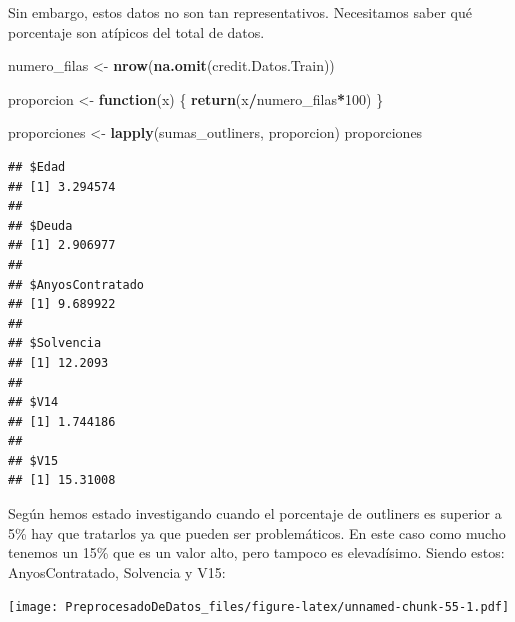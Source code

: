 \documentclass[
]{article}
\newenvironment{Shaded}{\begin{snugshade}}{\end{snugshade}}
\newcommand{\AttributeTok}[1]{\textcolor[rgb]{0.13,0.29,0.53}{#1}}
\newcommand{\ControlFlowTok}[1]{\textcolor[rgb]{0.13,0.29,0.53}{\textbf{#1}}}
\newcommand{\DecValTok}[1]{\textcolor[rgb]{0.00,0.00,0.81}{#1}}
\newcommand{\FloatTok}[1]{\textcolor[rgb]{0.00,0.00,0.81}{#1}}
\newcommand{\FunctionTok}[1]{\textcolor[rgb]{0.13,0.29,0.53}{\textbf{#1}}}
\newcommand{\NormalTok}[1]{#1}
\newcommand{\OtherTok}[1]{\textcolor[rgb]{0.56,0.35,0.01}{#1}}
\newcommand{\SpecialCharTok}[1]{\textcolor[rgb]{0.81,0.36,0.00}{\textbf{#1}}}
\newcommand{\StringTok}[1]{\textcolor[rgb]{0.31,0.60,0.02}{#1}}
\begin{document}
Sin embargo, estos datos no son tan representativos. Necesitamos saber
qué porcentaje son atípicos del total de datos.

\begin{Shaded}
\begin{Highlighting}[]
\NormalTok{numero\_filas }\OtherTok{\textless{}{-}} \FunctionTok{nrow}\NormalTok{(}\FunctionTok{na.omit}\NormalTok{(credit.Datos.Train))}

\NormalTok{proporcion }\OtherTok{\textless{}{-}} \ControlFlowTok{function}\NormalTok{(x) \{}
  \FunctionTok{return}\NormalTok{(x}\SpecialCharTok{/}\NormalTok{numero\_filas}\SpecialCharTok{*}\DecValTok{100}\NormalTok{)}
\NormalTok{\}}

\NormalTok{proporciones }\OtherTok{\textless{}{-}} \FunctionTok{lapply}\NormalTok{(sumas\_outliners, proporcion)}
\NormalTok{proporciones}
\end{Highlighting}
\end{Shaded}

\begin{verbatim}
## $Edad
## [1] 3.294574
## 
## $Deuda
## [1] 2.906977
## 
## $AnyosContratado
## [1] 9.689922
## 
## $Solvencia
## [1] 12.2093
## 
## $V14
## [1] 1.744186
## 
## $V15
## [1] 15.31008
\end{verbatim}

Según hemos estado investigando cuando el porcentaje de outliners es
superior a 5\% hay que tratarlos ya que pueden ser problemáticos. En
este caso como mucho tenemos un 15\% que es un valor alto, pero tampoco
es elevadísimo. Siendo estos: AnyosContratado, Solvencia y V15:

\begin{Shaded}
\end{Shaded}

\texttt{[image: PreprocesadoDeDatos\_files/figure-latex/unnamed-chunk-55-1.pdf]}
\end{document}

